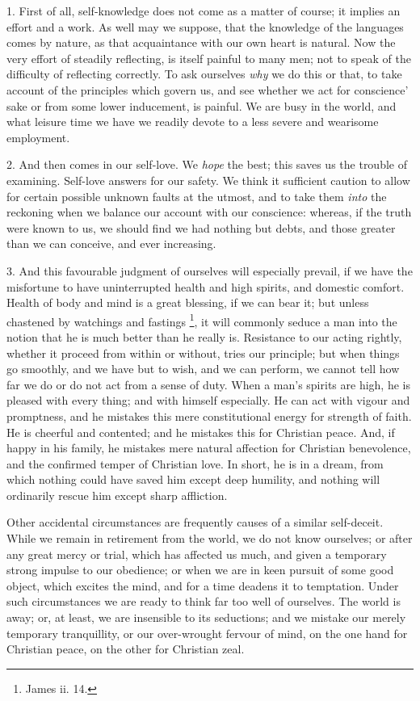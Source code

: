 1. First of all, self-knowledge does not come as a
matter of course; it implies an effort and a work. As
well may we suppose, that the knowledge of the languages
comes by nature, as that acquaintance with our own heart
is natural. Now the very effort of steadily reflecting,
is itself painful to many men; not to speak of the
difficulty of reflecting correctly. To ask ourselves \emph{why}
we do this or that, to take account of the principles
which govern us, and see whether we act for conscience'
sake or from some lower inducement, is painful. We are
busy in the world, and what leisure time we have we
readily devote to a less severe and wearisome employment.

2. And then comes in our self-love. We \emph{hope}
the best; this saves us the trouble of examining.
Self-love answers for our safety. We think it sufficient
caution to allow for certain possible unknown faults at
the utmost, and to take them \emph{into} the reckoning
when we balance our account with our conscience: whereas,
if the truth were known to us, we should find we had
nothing but debts, and those greater than we can
conceive, and ever increasing.

3. And this favourable judgment of ourselves will
especially prevail, if we have the misfortune to have
uninterrupted health and high spirits, and domestic
comfort. Health of body and mind is a great blessing, if
we can bear it; but unless chastened by watchings and
fastings \footnote{James ii. 14.}, it will commonly seduce a man
into the notion that he is much better than he really is.
Resistance to our acting rightly, whether it proceed from
within or without, tries our principle; but when things
go smoothly, and we have but to wish, and we can perform,
we cannot tell how far we do or do not act from a sense
of duty. When a man's spirits are high, he is pleased
with every thing; and with himself especially. He can act
with vigour and promptness, and he mistakes this mere
constitutional energy for strength of faith. He is
cheerful and contented; and he mistakes this for
Christian peace. And, if happy in his family, he mistakes
mere natural affection for Christian benevolence, and the
confirmed temper of Christian love. In short, he is in a
dream, from which nothing could have saved him except
deep humility, and nothing will ordinarily rescue him
except sharp affliction.

Other accidental circumstances are frequently causes
of a similar self-deceit. While we remain in retirement
from the world, we do not know ourselves; or after any
great mercy or trial, which has affected us much, and
given a temporary strong impulse to our obedience; or
when we are in keen pursuit of some good object, which
excites the mind, and for a time deadens it to
temptation. Under such circumstances we are ready to
think far too well of ourselves. The world is away; or,
at least, we are insensible to its seductions; and we
mistake our merely temporary tranquillity, or our
over-wrought fervour of mind, on the one hand for
Christian peace, on the other for Christian zeal.

